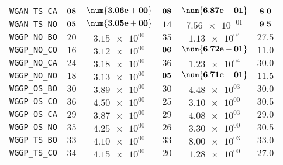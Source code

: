 \begin{table}[H]
\begin{tabularx}{\textwidth}{l||CC|CC||c}
		\texttt{WGAN\_TS\_CA} & $\bf 08$ & $\bf \num{3.06e+00}$ & $\bf 08$ & $\bf \num{6.87e-01}$ &$\bf 8.0$  \\
		\texttt{WGAN\_TS\_NO} & $\bf 05$ & $\bf \num{3.05e+00}$ & $ 14$ & $ \num{7.56e-01}$ &$\bf 9.5$  \\ \hline
		\texttt{WGGP\_NO\_BO} & $ 20$ & $ \num{3.15e+00}$ & $ 35$ & $ \num{1.13e+04}$ &$ 27.5$  \\
		\texttt{WGGP\_NO\_CO} & $ 16$ & $ \num{3.12e+00}$ & $\bf 06$ & $\bf \num{6.72e-01}$ &$ 11.0$  \\
		\texttt{WGGP\_NO\_CA} & $ 24$ & $ \num{3.18e+00}$ & $ 36$ & $ \num{1.23e+04}$ &$ 30.0$  \\
		\texttt{WGGP\_NO\_NO} & $ 18$ & $ \num{3.13e+00}$ & $\bf 05$ & $\bf \num{6.71e-01}$ &$ 11.5$  \\
		\texttt{WGGP\_OS\_BO} & $ 30$ & $ \num{3.89e+00}$ & $ 30$ & $ \num{4.48e+03}$ &$ 30.0$  \\
		\texttt{WGGP\_OS\_CO} & $ 36$ & $ \num{4.50e+00}$ & $ 25$ & $ \num{3.10e+00}$ &$ 30.5$  \\
		\texttt{WGGP\_OS\_CA} & $ 29$ & $ \num{3.87e+00}$ & $ 29$ & $ \num{4.08e+03}$ &$ 29.0$  \\
		\texttt{WGGP\_OS\_NO} & $ 35$ & $ \num{4.25e+00}$ & $ 26$ & $ \num{3.30e+00}$ &$ 30.5$  \\
		\texttt{WGGP\_TS\_BO} & $ 33$ & $ \num{4.10e+00}$ & $ 33$ & $ \num{8.00e+03}$ &$ 33.0$  \\
		\texttt{WGGP\_TS\_CO} & $ 34$ & $ \num{4.15e+00}$ & $ 20$ & $ \num{1.28e+00}$ &$ 27.0$  \\

\end{tabularx}
\end{table}
